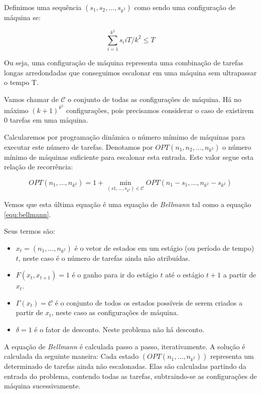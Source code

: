 Definimos uma sequência $(s_1, s_2, \ldots, s_{k^2})$ como sendo uma configuração de máquina se:

\begin{equation}
\sum_{i=1}^{k^2} s_i iT / k^2 \leq T
\end{equation}

Ou seja, uma configuração de máquina representa uma combinação de tarefas longas arredondadas que conseguimos escalonar em uma máquina sem ultrapassar o tempo T.

Vamos chamar de $ \mathcal{C} $ o conjunto de todas as configurações de máquina. Há no máximo $(k+1)^{k^2}$ configurações, pois precisamos considerar o caso de existirem $0$ tarefas em uma máquina.

Calcularemos por programação dinâmica o número mímimo de máquinas para executar este número de tarefas. Denotamos por $OPT(n_1, n_2, \ldots, n_{k^2})$ o número mínimo de máquinas suficiente para escalonar esta entrada. Este valor segue esta relação de recorrência:

\begin{equation}
OPT(n_1, \ldots, n_{k^2}) = 1 + \min_{(s1,\ldots,s_{k^2}) \in \mathcal{C}} OPT(n_1 - s_1, \ldots, n_{k^2} - s_{k^2})
\end{equation}

Vemos que esta última equação é uma equação de \textit{Bellmann} tal como a equação \ref{equ:bellmann}. 

Seus termos são: 

\begin{itemize}
\item $x_t = (n_1, \ldots, n_{k^2})$ é o vetor de estados em um estágio (ou período de tempo) $t$, neste caso é o número de tarefas ainda não atribuídas.
\item $F(x_t, x_{t+1}) = 1$ é o ganho para ir do estágio $t$ até o estágio $t+1$ a partir de $x_t$.
\item $\Gamma(x_t) = \mathcal{C}$ é o conjunto de todos os estados possíveis de serem criados a partir de $x_t$, neste caso as configurações de máquina.
\item $\delta = 1$ é o fator de desconto. Neste problema não há desconto.
\end{itemize}

A equação de \textit{Bellmann} é calculada passo a passo, iterativamente. A solução é calculada da seguinte maneira: Cada estado $(OPT(n_1, \ldots, n_{k^2}))$ representa um determinado de tarefas ainda não escalonadas. Elas são calculadas partindo da entrada do problema, contendo todas as tarefas, subtraindo-se as configurações de máquina sucessivamente.

